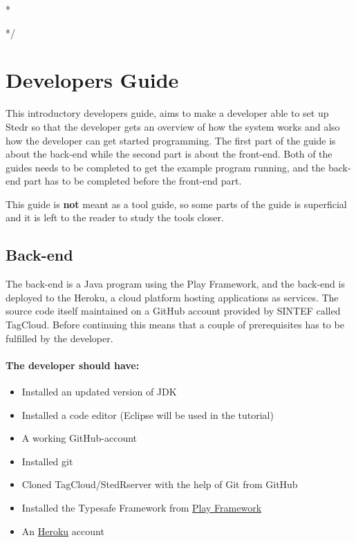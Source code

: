 
\/*

\usepackage{pslatex,palatino,avant,graphicx,color}
\usepackage[margin=2cm]{geometry}

%
*/


\section{Developers Guide}
This introductory developers guide, aims to make a developer able to set up Stedr so that the developer gets an overview of how the system works and also how the developer can get started programming. The first part of the guide is about the back-end while the second part is about the front-end. Both of the guides needs to be completed to get the example program running, and the back-end part has to be completed before the front-end part. 

\noindent

This guide is \textbf{not} meant as a tool guide, so some parts of the guide is superficial and it is left to the reader to study the tools closer.

\subsection{Back-end}

The back-end is a Java program using the Play Framework, and the back-end is deployed to the Heroku, a cloud platform hosting applications as services. The source code itself maintained on a GitHub account provided by SINTEF called TagCloud. Before continuing this means that a couple of prerequisites has to be fulfilled by the developer.

\paragraph{The developer should have:}
\begin{itemize}
\item Installed an updated version of JDK 
\item Installed a code editor (Eclipse will be used in the tutorial)
\item A working GitHub-account
\item Installed git
\item Cloned TagCloud/StedR\textunderscore server with the help of Git from GitHub
\item Installed the Typesafe Framework from \href{http://www.playframework.com/download}{Play Framework}
\item An \href{https://www.heroku.com/}{Heroku} account 
\end{itemize}  

